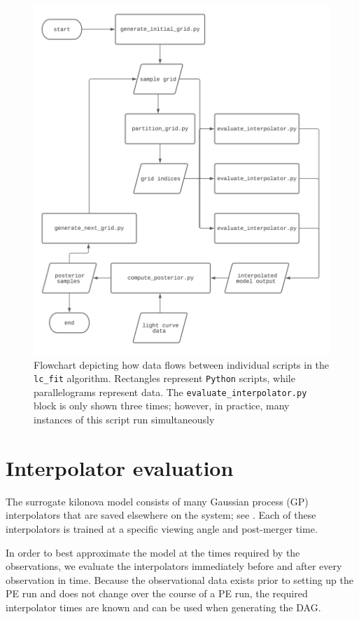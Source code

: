 \documentclass[11pt]{article}
\begin{document}
\begin{figure}
	\includegraphics[width=\textwidth]{lc_fit_flowchart.pdf}	\caption{Flowchart depicting how data flows between individual scripts in the \texttt{lc\_fit} algorithm. Rectangles represent \texttt{Python} scripts, while parallelograms represent data. The \texttt{evaluate\_interpolator.py} block is only shown three times; however, in practice, many instances of this script run simultaneously}
	\label{fig:flowchart}
\end{figure}

\section{Interpolator evaluation}

The surrogate kilonova model consists of many Gaussian process (GP) interpolators that are saved elsewhere on the system; see \cite{ristic2021}. Each of these interpolators is trained at a specific viewing angle and post-merger time.

In order to best approximate the model at the times required by the observations, we evaluate the interpolators immediately before and after every observation in time. Because the observational data exists prior to setting up the PE run and does not change over the course of a PE run, the required interpolator times are known and can be used when generating the DAG.
\end{document}
